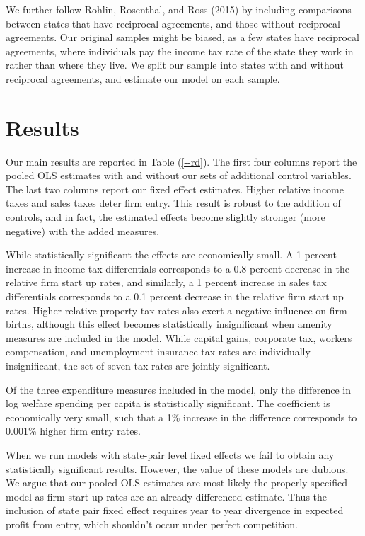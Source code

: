 \documentclass[12pt,a4paper]{article}
\begin{document}
We further follow Rohlin, Rosenthal, and Ross (2015) by including comparisons between states that have reciprocal agreements, and those without reciprocal agreements. Our original samples might be biased, as a few states have reciprocal agreements, where individuals pay the income tax rate of the state they work in rather than where they live. We split our sample into states with and without reciprocal agreements, and estimate our model on each sample.
\section{Results}

Our main results are reported in Table (\ref{--rd}). The first four columns report the pooled OLS estimates with and without our sets of additional control variables. The last two columns report our fixed effect estimates. Higher relative income taxes and sales taxes deter firm entry.  This result is robust to the addition of controls, and in fact, the estimated effects become slightly stronger (more negative) with the added measures.  

While statistically significant the effects are economically small.  A 1 percent increase in income tax differentials corresponds to a 0.8 percent decrease in the relative firm start up rates, and similarly, a 1 percent increase in sales tax differentials corresponds to a 0.1 percent decrease in the relative firm start up rates.  Higher relative property tax rates also exert a negative influence on firm births, although this effect becomes statistically insignificant when amenity measures are included in the model. While capital gains, corporate tax, workers compensation, and unemployment insurance tax rates are individually insignificant, the set of seven tax rates are jointly  significant. 

Of the three expenditure measures included in the model, only the difference in log welfare spending per capita is statistically significant. The coefficient is economically very small, such that a 1\% increase in the difference corresponds to 0.001\% higher firm entry rates.

When we run models with state-pair level fixed effects we fail to obtain any statistically significant results. However, the value of these models are dubious. We argue that our pooled OLS estimates are most likely the properly specified model as firm start up rates are an already differenced estimate. Thus the inclusion of state pair fixed effect requires year to year divergence in expected profit from entry, which shouldn’t occur under perfect competition.
\end{document}
